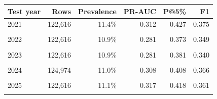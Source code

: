 \begin{tabular}{@{}lrrrrr@{}}
\toprule
Test year & Rows & Prevalence & PR-AUC & P@5\% & F1 \\
\midrule
2021 & 122,616 & 11.4\% & 0.312 & 0.427 & 0.375 \\\\
2022 & 122,616 & 10.9\% & 0.281 & 0.373 & 0.349 \\\\
2023 & 122,616 & 10.9\% & 0.281 & 0.381 & 0.340 \\\\
2024 & 124,974 & 11.0\% & 0.308 & 0.408 & 0.366 \\\\
2025 & 122,616 & 11.1\% & 0.317 & 0.418 & 0.361 \\\\
\bottomrule
\end{tabular}

